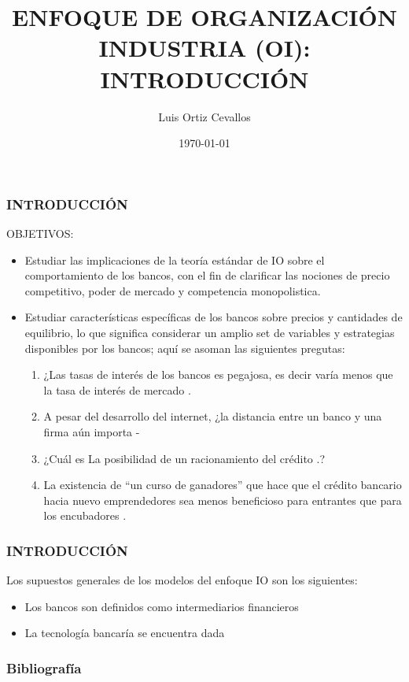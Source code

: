 \documentclass[10pt, xcolor=table, x11names]{beamer}
\title[]{ENFOQUE DE ORGANIZACIÓN INDUSTRIA (OI): INTRODUCCIÓN}
\author[Luis Ortiz]{Luis Ortiz Cevallos}
\institute[SECMCA]{\bf SECMCA}
\date[\today]{\footnotesize \today}
\begin{document}
\begin{frame}
\titlepage
\end{frame}




\begin{frame}
	\frametitle{{\normalsize INTRODUCCIÓN} {}}
OBJETIVOS:
\begin{itemize}
    \item Estudiar las implicaciones de la teoría estándar de IO sobre el comportamiento de los bancos, con el fin de clarificar las nociones de precio competitivo, poder de mercado y competencia monopolistica.
    \item Estudiar características específicas de los bancos sobre precios y cantidades de equilibrio, lo que significa considerar un amplio set de variables y estrategias disponibles por los bancos; aquí se asoman las siguientes pregutas:
    \begin{enumerate}
        \item ¿Las tasas de interés de los bancos es pegajosa, es decir varía menos que la tasa de interés de mercado \cite{bibid}.
        \item A pesar del desarrollo del internet, ¿la distancia entre un banco y una firma aún importa \cite{bibid}-
        \item ¿Cuál es La posibilidad de un racionamiento del crédito \cite{bibid}.?
        \item La existencia de ``un curso de ganadores'' que hace que el crédito bancario hacia nuevo emprendedores sea menos beneficioso para entrantes que para los encubadores \cite{bibid}.
          
    \end{enumerate}
\end{itemize}
\end{frame}



\begin{frame}
    \frametitle{{\normalsize INTRODUCCIÓN} {}}
      Los supuestos generales de los modelos del enfoque IO son los siguientes:
      \begin{itemize}
          \item Los bancos son definidos como intermediarios financieros 
          \item La tecnología bancaría se encuentra dada
      \end{itemize}
\end{frame}

\begin{frame}[allowframebreaks]
\frametitle{{\large 
		Bibliografía}}
\renewcommand{\refname}{Referencias}


\end{frame}
\end{document}
